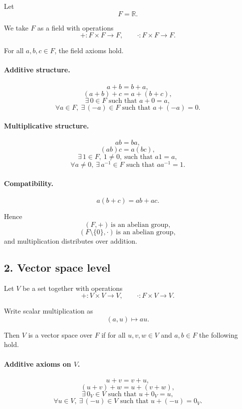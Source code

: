 \documentclass{article}
\begin{document}
	Let
	$$
	F=\mathbb{R}.
	$$
	
	We take $F$ as a field with operations
	$$
	+ : F\times F \to F,
	\qquad
	\cdot : F\times F \to F.
	$$
	
	For all $a,b,c\in F$, the field axioms hold.
	
	\paragraph{Additive structure.}
	$$
	a+b=b+a,
	$$
	$$
	(a+b)+c=a+(b+c),
	$$
	$$
	\exists\,0\in F \text{ such that } a+0=a,
	$$
	$$
	\forall a\in F,\ \exists\,(-a)\in F \text{ such that } a+(-a)=0.
	$$
	
	\paragraph{Multiplicative structure.}
	$$
	ab=ba,
	$$
	$$
	(ab)c=a(bc),
	$$
	$$
	\exists\,1\in F,\ 1\neq 0,\ \text{such that } a1=a,
	$$
	$$
	\forall a\neq 0,\ \exists\,a^{-1}\in F \text{ such that } aa^{-1}=1.
	$$
	
	\paragraph{Compatibility.}
	$$
	a(b+c)=ab+ac.
	$$
	
	Hence
	$$
	(F,+)\ \text{is an abelian group},
	$$
	$$
	(F\setminus\{0\},\cdot)\ \text{is an abelian group},
	$$
	and multiplication distributes over addition.
	
	\subsection*{2. Vector space level}
	
	Let $V$ be a set together with operations
	$$
	+ : V\times V \to V,
	\qquad
	\cdot : F\times V \to V.
	$$
	
	Write scalar multiplication as
	$$
	(a,u)\mapsto au.
	$$
	
	Then $V$ is a vector space over $F$ if for all $u,v,w\in V$ and $a,b\in F$ the following hold.
	
	\paragraph{Additive axioms on $V$.}
	$$
	u+v=v+u,
	$$
	$$
	(u+v)+w=u+(v+w),
	$$
	$$
	\exists\,0_V\in V \text{ such that } u+0_V=u,
	$$
	$$
	\forall u\in V,\ \exists\,(-u)\in V \text{ such that } u+(-u)=0_V.
	$$
	
\end{document}
